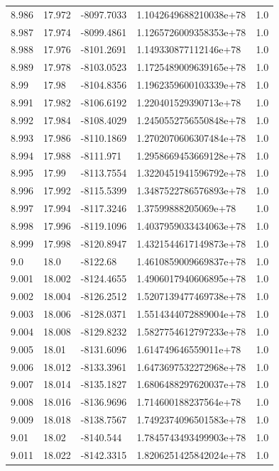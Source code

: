 \begin{tabular}{lllll}
8.986 & 17.972 & -8097.7033 & 1.1042649688210038e+78 & 1.0 \\
8.987 & 17.974 & -8099.4861 & 1.1265726009358353e+78 & 1.0 \\
8.988 & 17.976 & -8101.2691 & 1.149330877112146e+78 & 1.0 \\
8.989 & 17.978 & -8103.0523 & 1.1725489009639165e+78 & 1.0 \\
8.99 & 17.98 & -8104.8356 & 1.1962359600103339e+78 & 1.0 \\
8.991 & 17.982 & -8106.6192 & 1.220401529390713e+78 & 1.0 \\
8.992 & 17.984 & -8108.4029 & 1.2450552756550848e+78 & 1.0 \\
8.993 & 17.986 & -8110.1869 & 1.2702070606307484e+78 & 1.0 \\
8.994 & 17.988 & -8111.971 & 1.2958669453669128e+78 & 1.0 \\
8.995 & 17.99 & -8113.7554 & 1.3220451941596792e+78 & 1.0 \\
8.996 & 17.992 & -8115.5399 & 1.3487522786576893e+78 & 1.0 \\
8.997 & 17.994 & -8117.3246 & 1.37599888205069e+78 & 1.0 \\
8.998 & 17.996 & -8119.1096 & 1.4037959033434063e+78 & 1.0 \\
8.999 & 17.998 & -8120.8947 & 1.4321544617149873e+78 & 1.0 \\
9.0 & 18.0 & -8122.68 & 1.4610859009669837e+78 & 1.0 \\
9.001 & 18.002 & -8124.4655 & 1.4906017940606895e+78 & 1.0 \\
9.002 & 18.004 & -8126.2512 & 1.5207139477469738e+78 & 1.0 \\
9.003 & 18.006 & -8128.0371 & 1.5514344072889004e+78 & 1.0 \\
9.004 & 18.008 & -8129.8232 & 1.5827754612797233e+78 & 1.0 \\
9.005 & 18.01 & -8131.6096 & 1.614749646559011e+78 & 1.0 \\
9.006 & 18.012 & -8133.3961 & 1.6473697532272968e+78 & 1.0 \\
9.007 & 18.014 & -8135.1827 & 1.6806488297620037e+78 & 1.0 \\
9.008 & 18.016 & -8136.9696 & 1.714600188237564e+78 & 1.0 \\
9.009 & 18.018 & -8138.7567 & 1.7492374096501583e+78 & 1.0 \\
9.01 & 18.02 & -8140.544 & 1.7845743493499903e+78 & 1.0 \\
9.011 & 18.022 & -8142.3315 & 1.8206251425842024e+78 & 1.0 \\

\end{tabular}
